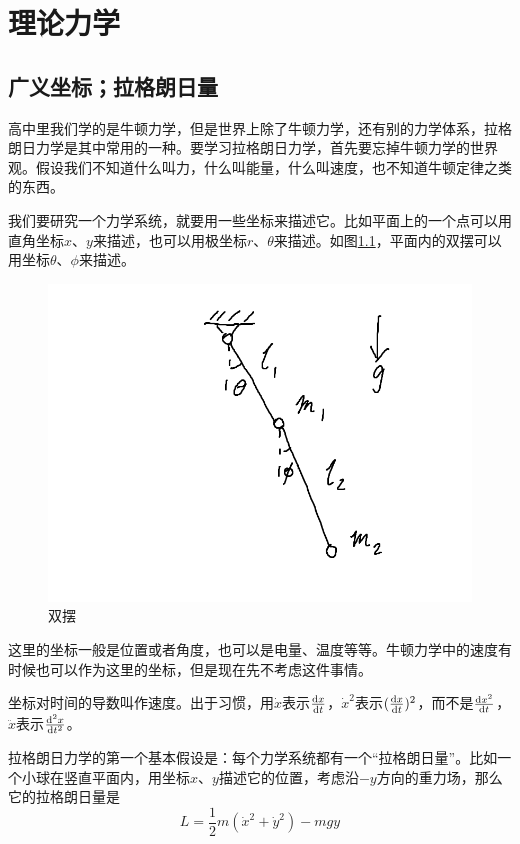 \chapter{理论力学}
\section{广义坐标；拉格朗日量}
高中里我们学的是牛顿力学，但是世界上除了牛顿力学，还有别的力学体系，拉格朗日力学是其中常用的一种。要学习拉格朗日力学，首先要忘掉牛顿力学的世界观。假设我们不知道什么叫力，什么叫能量，什么叫速度，也不知道牛顿定律之类的东西。

我们要研究一个力学系统，就要用一些坐标来描述它。比如平面上的一个点可以用直角坐标$x$、$y$来描述，也可以用极坐标$r$、$\theta$来描述。如图\ref{fig-double-pend}，平面内的双摆可以用坐标$\theta$、$\phi$来描述。
\begin{figure}[htb]
\centering
\includegraphics[scale=0.5]{fig/double-pend.png}
\caption{双摆}
\label{fig-double-pend}
\end{figure}

这里的坐标一般是位置或者角度，也可以是电量、温度等等。牛顿力学中的速度有时候也可以作为这里的坐标，但是现在先不考虑这件事情。

坐标对时间的导数叫作速度。出于习惯，用$\dot x$表示$\frac{\mathop{}\!\mathrm{d} x}{\mathop{}\!\mathrm{d} t}$，$\dot x^2$表示$(\frac{\mathop{}\!\mathrm{d} x}{\mathop{}\!\mathrm{d} t})^2$，而不是$\frac{\mathop{}\!\mathrm{d} x^2}{\mathop{}\!\mathrm{d} t}$，$\ddot x$表示$\frac{\mathop{}\!\mathrm{d}^2 x}{\mathop{}\!\mathrm{d} t^2}$。

拉格朗日力学的第一个基本假设是：每个力学系统都有一个“拉格朗日量”。比如一个小球在竖直平面内，用坐标$x$、$y$描述它的位置，考虑沿$-y$方向的重力场，那么它的拉格朗日量是
\begin{equation*}
L=\frac{1}{2}m(\dot x^2+\dot y^2)-m g y
\end{equation*}

